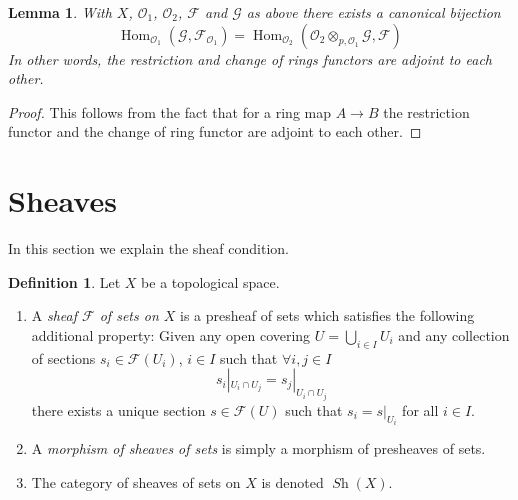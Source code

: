 \documentclass{stacks-project}
\theoremstyle{plain}
\newtheorem{lemma}[subsection]{Lemma}
\theoremstyle{definition}
\newtheorem{definition}[subsection]{Definition}
\theoremstyle{remark}
\numberwithin{equation}{subsection}
\def\Hom{\mathop{\mathrm{Hom}}\nolimits}
\def\Sh{\mathop{\mathit{Sh}}\nolimits}
\begin{document}
\begin{lemma}
\label{lemma-adjointness-tensor-restrict-presheaves}
With $X$, $\mathcal{O}_1$, $\mathcal{O}_2$, $\mathcal{F}$ and
$\mathcal{G}$ as above there exists a canonical bijection
$$
\Hom_{\mathcal{O}_1}(\mathcal{G}, \mathcal{F}_{\mathcal{O}_1})
=
\Hom_{\mathcal{O}_2}(
\mathcal{O}_2 \otimes_{p, \mathcal{O}_1} \mathcal{G},
\mathcal{F}
)
$$
In other words, the restriction and change of rings functors
are adjoint to each other.
\end{lemma}

\begin{proof}
This follows from the fact that for a ring map
$A \to B$ the restriction functor and the change
of ring functor are adjoint to each other.
\end{proof}





\section{Sheaves}
\label{section-sheaves}

\noindent
In this section we explain the sheaf condition.

\begin{definition}
\label{definition-sheaf}
Let $X$ be a topological space.
\begin{enumerate}
\item A {\it sheaf $\mathcal{F}$ of sets on $X$} is a presheaf
of sets which satisfies the following additional property: Given
any open covering $U = \bigcup_{i \in I} U_i$ and any collection
of sections $s_i \in \mathcal{F}(U_i)$, $i \in I$ such that
$\forall i, j\in I$
$$
s_i|_{U_i \cap U_j} = s_j|_{U_i \cap U_j}
$$
there exists a unique section $s \in \mathcal{F}(U)$ such that
$s_i = s|_{U_i}$ for all $i \in I$.
\item A {\it morphism of sheaves of sets} is simply a
morphism of presheaves of sets.
\item The category of sheaves of sets on $X$ is denoted
$\Sh(X)$.
\end{enumerate}
\end{definition}
\end{document}

